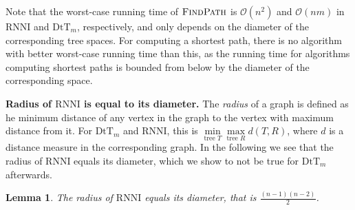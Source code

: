 \documentclass[11pt]{amsart}
\newtheorem{lemma}{Lemma}
\newcommand{\rnni}{\mathrm{RNNI}}
\newcommand{\findpath}{\textsc{FindPath}}
\newcommand{\dtt}{\mathrm{DtT}}
\renewcommand{\O}{\mathcal O}
\newcommand{\summary}[1]{\textbf{#1}} %
\begin{document}
Note that the worst-case running time of $\findpath$ is $\O(n^2)$ and $\O(nm)$ in $\rnni$ and $\dtt_m$, respectively, and only depends on the diameter of the corresponding tree spaces.
For computing a shortest path, there is no algorithm with better worst-case running time than this, as the running time for algorithms computing shortest paths is bounded from below by the diameter of the corresponding space.

\summary{Radius of $\rnni$ is equal to its diameter.}
The \emph{radius} of a graph is defined as he minimum distance of any vertex in the graph to the vertex with maximum distance from it.
For $\dtt_m$ and $\rnni$, this is $\min\limits_{\text{tree } T}\max\limits_{\text{tree }R} d(T,R)$, where $d$ is a distance measure in the corresponding graph.
In the following we see that the radius of $\rnni$ equals its diameter, which we show to not be true for $\dtt_m$ afterwards.

\begin{lemma}
	The radius of $\rnni$ equals its diameter, that is $\frac{(n-1)(n-2)}{2}$.
	\label{lemma:radius_rnni}
\end{lemma}
\end{document}
